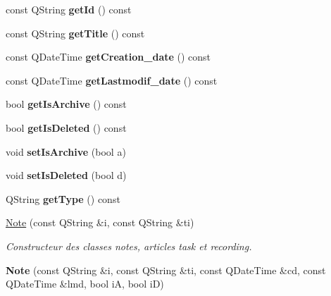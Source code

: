 \begin{DoxyCompactItemize}
\item 
\mbox{\label{class_note_a8a7271e7e9f3fcc04944361f7ea0b846}} 
const Q\+String {\bfseries get\+Id} () const
\item 
\mbox{\label{class_note_a7cd1137ae025c9495c5c24b1db90cbb3}} 
const Q\+String {\bfseries get\+Title} () const
\item 
\mbox{\label{class_note_af29efb383791ec5d16f6db3fb5c7205d}} 
const Q\+Date\+Time {\bfseries get\+Creation\+\_\+date} () const
\item 
\mbox{\label{class_note_a394327fab9f02f4d4e87b3ee78d99121}} 
const Q\+Date\+Time {\bfseries get\+Lastmodif\+\_\+date} () const
\item 
\mbox{\label{class_note_a8fc3517be2c98114e1912080b7f12d57}} 
bool {\bfseries get\+Is\+Archive} () const
\item 
\mbox{\label{class_note_a76e4262b2c064b8ec4791ab1316d5568}} 
bool {\bfseries get\+Is\+Deleted} () const
\item 
\mbox{\label{class_note_a4174e5bcefa138c9e5d55b34239b2e5d}} 
void {\bfseries set\+Is\+Archive} (bool a)
\item 
\mbox{\label{class_note_ae112c975e37801222608656927568a37}} 
void {\bfseries set\+Is\+Deleted} (bool d)
\item 
\mbox{\label{class_note_ad6325df1dc1410d7854cac36ff312b8c}} 
Q\+String {\bfseries get\+Type} () const
\item 
\hyperlink{class_note_a0490153115307d5f59974d7000260e48}{Note} (const Q\+String \&i, const Q\+String \&ti)
\begin{DoxyCompactList}\small\item\em Constructeur des classes notes, articles task et recording. \end{DoxyCompactList}\item 
\mbox{\label{class_note_a0c1c2ba85358585f266b0fdcbcb45a70}} 
{\bfseries Note} (const Q\+String \&i, const Q\+String \&ti, const Q\+Date\+Time \&cd, const Q\+Date\+Time \&lmd, bool iA, bool iD)

\end{DoxyCompactItemize}
